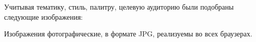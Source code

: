 Учитывая тематику, стиль, палитру, целевую аудиторию были подобраны следующие изображения:

\noindent
\begin{minipage}{\linewidth}
\end{minipage}
\bigskip

\noindent
\begin{minipage}{\linewidth}
\end{minipage}
\bigskip

Изображения фотографические, в формате JPG, реализуемы во всех браузерах.

\noindent
\begin{minipage}{\linewidth}
\end{minipage}
\bigskip

\noindent
\begin{minipage}{\linewidth}
\end{minipage}
\bigskip

